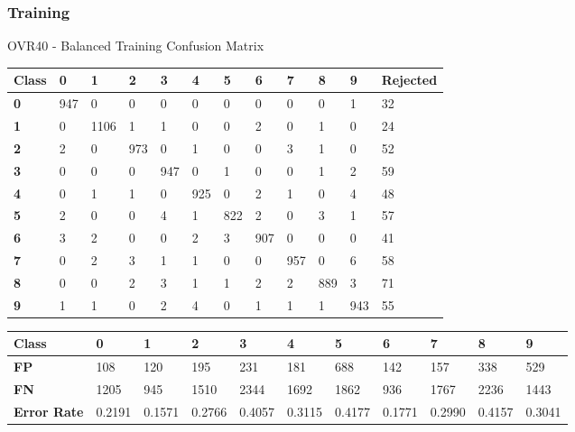 \documentclass[
  a4paper,            %
  DIV=10,             %
  oneside,            %
  BCOR=5mm,           %
  parskip=half,       %
  numbers=noenddot,   %
  bibtotoc,           %
  listof=totoc,        %
  article
]{scrreprt}
\begin{document}
\subsubsection{Training}
\begin{center}
  \small{OVR40 - Balanced Training Confusion Matrix}
  \begin{tabular}{|p{1cm}|p{1cm}|p{1cm}|p{1cm}|p{1cm}|p{1cm}|p{1cm}|p{1cm}|p{1cm}|p{1cm}|p{1cm}|p{1.7cm}|}
    \hline
    \textbf{Class} & \textbf{0} & \textbf{1} & \textbf{2} & \textbf{3} & \textbf{4} & \textbf{5} & \textbf{6} & \textbf{7} & \textbf{8} & \textbf{9} & \textbf{Rejected} \\
    \hline
    \textbf{0} & 947 & 0 & 0 & 0 & 0 & 0 & 0 & 0 & 0 & 1 & 32 \\
    \hline
    \textbf{1} & 0 & 1106 & 1 & 1 & 0 & 0 & 2 & 0 & 1 & 0 & 24 \\
    \hline
    \textbf{2} & 2 & 0 & 973 & 0 & 1 & 0 & 0 & 3 & 1 & 0 & 52 \\
    \hline
    \textbf{3} & 0 & 0 & 0 & 947 & 0 & 1 & 0 & 0 & 1 & 2 & 59 \\
    \hline
    \textbf{4} & 0 & 1 & 1 & 0 & 925 & 0 & 2 & 1 & 0 & 4 & 48 \\
    \hline
    \textbf{5} & 2 & 0 & 0 & 4 & 1 & 822 & 2 & 0 & 3 & 1 & 57 \\
    \hline
    \textbf{6} & 3 & 2 & 0 & 0 & 2 & 3 & 907 & 0 & 0 & 0 & 41 \\
    \hline
    \textbf{7} & 0 & 2 & 3 & 1 & 1 & 0 & 0 & 957 & 0 & 6 & 58 \\
    \hline
    \textbf{8} & 0 & 0 & 2 & 3 & 1 & 1 & 2 & 2 & 889 & 3 & 71 \\
    \hline
    \textbf{9} & 1 & 1 & 0 & 2 & 4 & 0 & 1 & 1 & 1 & 943 & 55 \\
    \hline
  \end{tabular}
\end{center}

\begin{center}
  \begin{tabular}{|p{1cm}|p{1cm}|p{1cm}|p{1cm}|p{1cm}|p{1cm}|p{1cm}|p{1cm}|p{1cm}|p{1cm}|p{1cm}|}
    \hline
    \textbf{Class} & \textbf{0} & \textbf{1} & \textbf{2} & \textbf{3} & \textbf{4} & \textbf{5} & \textbf{6} & \textbf{7} & \textbf{8} & \textbf{9} \\
    \hline
    \textbf{FP} & 108 & 120 & 195 & 231 & 181 & 688 & 142 & 157 & 338 & 529 \\
    \hline
    \textbf{FN} & 1205 & 945 & 1510 & 2344 & 1692 & 1862 & 936 & 1767 & 2236 & 1443 \\
    \hline
    \textbf{Error Rate} & 0.2191 & 0.1571 & 0.2766 & 0.4057 & 0.3115 & 0.4177 & 0.1771 & 0.2990 & 0.4157 & 0.3041 \\
    \hline
  \end{tabular}
\end{center}
\end{document}
